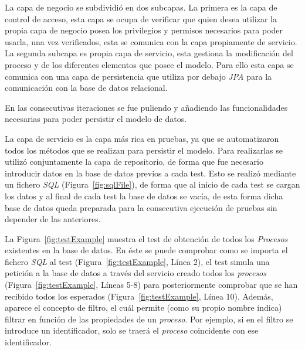 La capa de negocio se subdividió en dos subcapas. La primera es la capa de control de acceso, esta capa se ocupa de verificar que quien desea utilizar la propia capa de negocio posea los privilegios y permisos necesarios para poder usarla, una vez verificados, esta se comunica con la capa propiamente de servicio. La segunda subcapa es propia capa de servicio, esta gestiona la modificación del proceso y de los diferentes elementos que posee el modelo. Para ello esta capa se comunica con una capa de persistencia que utiliza por debajo \emph{JPA} para la comunicación con la base de datos relacional.



En las consecutivas iteraciones se fue puliendo y añadiendo las funcionalidades necesarias para poder persistir el modelo de datos.

La capa de servicio es la capa más rica en pruebas, ya que se automatizaron todos los métodos que se realizan para persistir el modelo. Para realizarlas se utilizó conjuntamente la capa de repositorio, de forma que fue necesario introducir datos en la base de datos previos a cada test. Esto se realizó mediante un fichero \emph{SQL} (Figura~\ref{fig:sqlFile}), de forma que al inicio de cada test se cargan los datos y al final de cada test la base de datos se vacía, de esta forma dicha base de datos queda preparada para la consecutiva ejecución de pruebas sin depender de las anteriores.

La Figura~\ref{fig:testExample} muestra el test de obtención de todos los \emph{Procesos} existentes en la base de datos. En éste se puede comprobar como se importa el fichero \emph{SQL} al test (Figura~\ref{fig:testExample}, Línea 2), el test simula una petición a la base de datos a través del servicio creado todos los \emph{procesos} (Figura~\ref{fig:testExample}, Líneas 5-8) para posteriormente comprobar que se han recibido todos los esperados (Figura~\ref{fig:testExample}, Línea 10). Además, aparece el concepto de filtro, el cuál permite (como su propio nombre indica) filtrar en función de las propiedades de un \emph{proceso}. Por ejemplo, si en el filtro se introduce un identificador, solo se traerá el \emph{proceso} coincidente con ese identificador.

